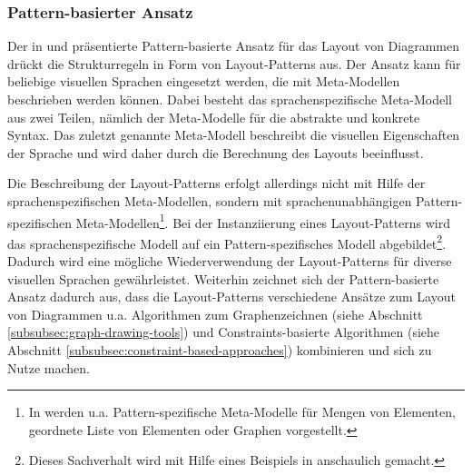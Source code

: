 


\subsubsection{Pattern-basierter Ansatz}

Der in \cite{Maier12A-Pattern-based} und \cite{MaierMinas10Combination} präsentierte Pattern-basierte Ansatz für das Layout von Diagrammen drückt die Strukturregeln in Form von Layout-Patterns aus. Der Ansatz kann für beliebige visuellen Sprachen eingesetzt werden, die mit Meta-Modellen beschrieben werden können. Dabei besteht das sprachenspezifische Meta-Modell aus zwei Teilen, nämlich der Meta-Modelle für die abstrakte und konkrete Syntax. Das zuletzt genannte Meta-Modell beschreibt die visuellen Eigenschaften der Sprache und wird daher durch die Berechnung des Layouts beeinflusst.

Die Beschreibung der Layout-Patterns erfolgt allerdings nicht mit Hilfe der sprachenspezifischen Meta-Modellen, sondern mit sprachenunabhängigen Pattern-spezifischen Meta-Model\-len\footnote{In \cite{Maier12A-Pattern-based} werden u.a. Pattern-spezifische Meta-Modelle für Mengen von Elementen, geordnete Liste von Elementen oder Graphen vorgestellt.}. Bei der Instanziierung eines Layout-Patterns wird das sprachenspezifische Modell auf ein Pattern-spezifisches Modell abgebildet\footnote{Dieses Sachverhalt wird mit Hilfe eines Beispiels in \cite[S.59ff]{Maier12A-Pattern-based} anschaulich gemacht.}. Dadurch wird eine mögliche Wiederverwendung der Layout-Patterns für diverse visuellen Sprachen gewährleistet. Weiterhin zeichnet sich der Pattern-basierte Ansatz dadurch aus, dass die Layout-Patterns verschiedene Ansätze zum Layout von Diagrammen u.a. Algorithmen zum Graphenzeichnen (siehe Abschnitt \ref{subsubsec:graph-drawing-tools}) und Constraints-basierte Algorithmen (siehe Abschnitt \ref{subsubsec:constraint-based-approaches}) kombinieren und sich zu Nutze machen.




